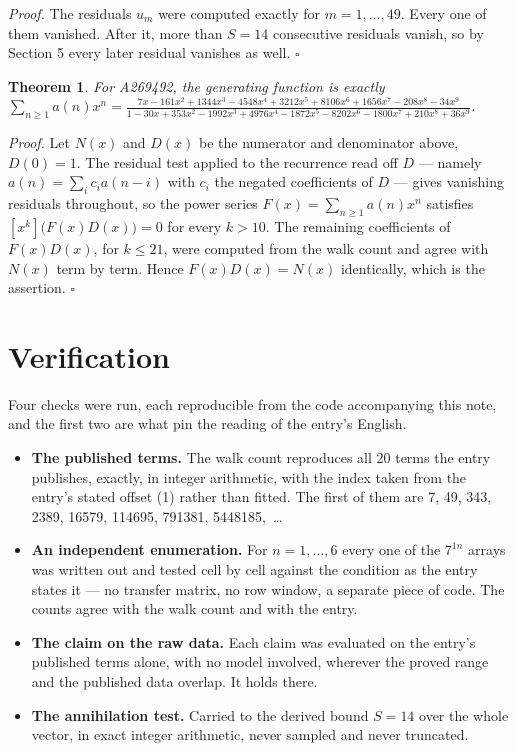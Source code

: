 \documentclass[11pt]{article}
\newtheorem{theorem}{Theorem}
\theoremstyle{definition}
\begin{document}
{\itshape Proof.} The residuals $u_m$ were computed exactly for $m = 1,\dots,49$. Every one of them vanished. After it, more than $S = 14$ consecutive residuals vanish, so by Section 5 every later residual vanishes as well. $\square$

\begin{theorem} For A269492, the generating function is exactly $\sum_{n\ge 1} a(n)x^n = \frac{7x - 161x^{2} + 1344x^{3} - 4548x^{4} + 3212x^{5} + 8106x^{6} + 1656x^{7} - 208x^{8} - 34x^{9}}{1 - 30x + 353x^{2} - 1992x^{3} + 4976x^{4} - 1872x^{5} - 8202x^{6} - 1800x^{7} + 210x^{8} + 36x^{9}}$.\end{theorem}

{\itshape Proof.} Let $N(x)$ and $D(x)$ be the numerator and denominator above, $D(0)=1$. The residual test applied to the recurrence read off $D$ --- namely $a(n) = \sum_i c_i a(n-i)$ with $c_i$ the negated coefficients of $D$ --- gives vanishing residuals throughout, so the power series $F(x)=\sum_{n\ge 1}a(n)x^n$ satisfies $[x^k]\bigl(F(x)D(x)\bigr) = 0$ for every $k > 10$. The remaining coefficients of $F(x)D(x)$, for $k \le 21$, were computed from the walk count and agree with $N(x)$ term by term. Hence $F(x)D(x) = N(x)$ identically, which is the assertion. $\square$

\section{Verification}

Four checks were run, each reproducible from the code accompanying this note, and the first two are what pin the reading of the entry's English.

\begin{itemize}

\item {\bfseries The published terms.} The walk count reproduces all 20 terms the entry publishes, exactly, in integer arithmetic, with the index taken from the entry's stated offset (1) rather than fitted. The first of them are 7, 49, 343, 2389, 16579, 114695, 791381, 5448185,~\dots

\item {\bfseries An independent enumeration.} For $n = 1,\dots,6$ every one of the $7^{1n}$ arrays was written out and tested cell by cell against the condition as the entry states it --- no transfer matrix, no row window, a separate piece of code. The counts agree with the walk count and with the entry.

\item {\bfseries The claim on the raw data.} Each claim was evaluated on the entry's published terms alone, with no model involved, wherever the proved range and the published data overlap. It holds there.

\item {\bfseries The annihilation test.} Carried to the derived bound $S = 14$ over the whole vector, in exact integer arithmetic, never sampled and never truncated.

\end{itemize}
\end{document}
